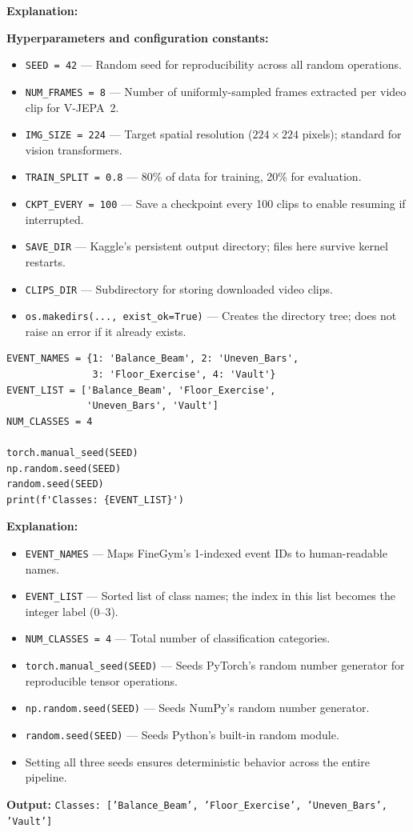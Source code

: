 \documentclass[a4paper, 12pt]{article}
\newenvironment{explanation}{%
  \par\smallskip
  \noindent\textcolor{blue!70!black}{\textbf{Explanation:}}\\
  \noindent
}{\par\medskip}
\begin{document}
\begin{explanation}
\textbf{Hyperparameters and configuration constants:}
\begin{itemize}[nosep]
  \item \texttt{SEED = 42} --- Random seed for reproducibility across all random operations.
  \item \texttt{NUM\_FRAMES = 8} --- Number of uniformly-sampled frames extracted per video clip for V-JEPA~2.
  \item \texttt{IMG\_SIZE = 224} --- Target spatial resolution ($224 \times 224$ pixels); standard for vision transformers.
  \item \texttt{TRAIN\_SPLIT = 0.8} --- 80\% of data for training, 20\% for evaluation.
  \item \texttt{CKPT\_EVERY = 100} --- Save a checkpoint every 100 clips to enable resuming if interrupted.
  \item \texttt{SAVE\_DIR} --- Kaggle's persistent output directory; files here survive kernel restarts.
  \item \texttt{CLIPS\_DIR} --- Subdirectory for storing downloaded video clips.
  \item \texttt{os.makedirs(..., exist\_ok=True)} --- Creates the directory tree; does not raise an error if it already exists.
\end{itemize}
\end{explanation}

\begin{lstlisting}
EVENT_NAMES = {1: 'Balance_Beam', 2: 'Uneven_Bars',
               3: 'Floor_Exercise', 4: 'Vault'}
EVENT_LIST = ['Balance_Beam', 'Floor_Exercise',
              'Uneven_Bars', 'Vault']
NUM_CLASSES = 4

torch.manual_seed(SEED)
np.random.seed(SEED)
random.seed(SEED)
print(f'Classes: {EVENT_LIST}')
\end{lstlisting}

\begin{explanation}
\begin{itemize}[nosep]
  \item \texttt{EVENT\_NAMES} --- Maps FineGym's 1-indexed event IDs to human-readable names.
  \item \texttt{EVENT\_LIST} --- Sorted list of class names; the index in this list becomes the integer label (0--3).
  \item \texttt{NUM\_CLASSES = 4} --- Total number of classification categories.
  \item \texttt{torch.manual\_seed(SEED)} --- Seeds PyTorch's random number generator for reproducible tensor operations.
  \item \texttt{np.random.seed(SEED)} --- Seeds NumPy's random number generator.
  \item \texttt{random.seed(SEED)} --- Seeds Python's built-in random module.
  \item Setting all three seeds ensures deterministic behavior across the entire pipeline.
\end{itemize}
\textbf{Output:} \texttt{Classes: ['Balance\_Beam', 'Floor\_Exercise', 'Uneven\_Bars', 'Vault']}
\end{explanation}
\end{document}
